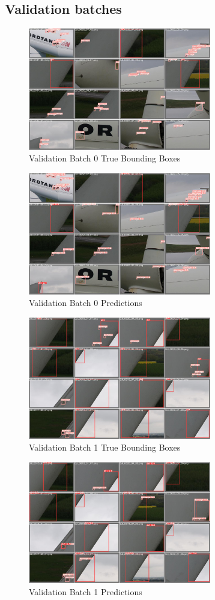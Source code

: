 \documentclass[conference]{IEEEtran}
\begin{document}
\subsection{Validation batches}
\begin{figure}[H]
    \centering
    \includegraphics[width=8cm]{Images/YOLOv5m/val_batch0_labels.jpg}
    \caption{Validation Batch 0 True Bounding Boxes}
\end{figure}
\begin{figure}[H]
    \centering
    \includegraphics[width=8cm]{Images/YOLOv5m/val_batch0_pred.jpg}
    \caption{Validation Batch 0 Predictions}
\end{figure}
\begin{figure}[H]
    \centering
    \includegraphics[width=8cm]{Images/YOLOv5m/val_batch1_labels.jpg}
    \caption{Validation Batch 1 True Bounding Boxes}
\end{figure}
\begin{figure}[H]
    \centering
    \includegraphics[width=8cm]{Images/YOLOv5m/val_batch1_pred.jpg}
    \caption{Validation Batch 1 Predictions}
\end{figure}
\end{document}

